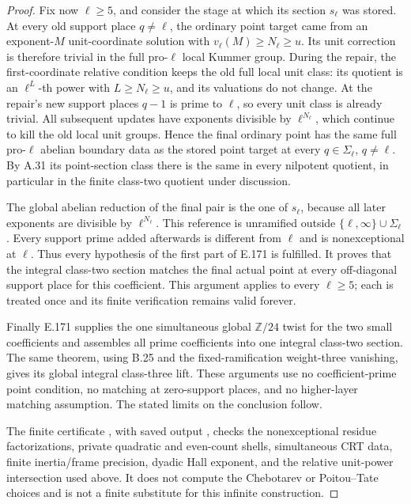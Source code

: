 \begin{proof}
Fix now \(\ell\ge5\), and consider the stage at which its
section \(s_\ell\) was stored. At every old support place
\(q\ne\ell\), the ordinary point target came from an
exponent-\(M\) unit-coordinate solution with
\(v_\ell(M)\ge N_\ell\ge u\). Its unit correction is
therefore trivial in the full pro-\(\ell\) local Kummer
group. During the repair, the first-coordinate relative condition
keeps the old full local unit class: its quotient is an
\(\ell^L\)-th power with \(L\ge N_\ell\ge u\),
and its valuations do not change. At the repair's new support
places \(q-1\) is prime to \(\ell\), so every unit class
is already trivial. All subsequent updates have exponents
divisible by \(\ell^{N_\ell}\), which continue to kill
the old local unit groups. Hence the final ordinary point has
the same full pro-\(\ell\) abelian boundary data as the
stored point target at every \(q\in\Sigma_\ell\),
\(q\ne\ell\). By A.31 its point-section class there is
the same in every nilpotent quotient, in particular in the finite
class-two quotient under discussion.

The global abelian reduction of the final pair is the one of
\(s_\ell\), because all later exponents are divisible by
\(\ell^{N_\ell}\). This reference is unramified outside
\(\{\ell,\infty\}\cup\Sigma_\ell\). Every support
prime added afterwards is different from \(\ell\) and is
nonexceptional at \(\ell\). Thus every hypothesis of the
first part of E.171 is fulfilled. It proves that the integral
class-two section matches the final actual point at every
off-diagonal support place for this coefficient. This argument
applies to every \(\ell\ge5\); each is treated once and
its finite verification remains valid forever.

Finally E.171 supplies the one simultaneous global
\(\mathbb Z/24\) twist for the two small coefficients and
assembles all prime coefficients into one integral class-two
section. The same theorem, using B.25 and the fixed-ramification
weight-three vanishing, gives its global integral class-three
lift. These arguments use no coefficient-prime point condition,
no matching at zero-support places, and no higher-layer matching
assumption. The stated limits on the conclusion follow.

The finite certificate ,
with saved output ,
checks the nonexceptional residue factorizations, private quadratic
and even-count shells, simultaneous CRT data, finite inertia/frame
precision, dyadic Hall exponent, and the relative unit-power
intersection used above. It does not compute the Chebotarev or
Poitou--Tate choices and is not a finite substitute for this
infinite construction.
\end{proof}
